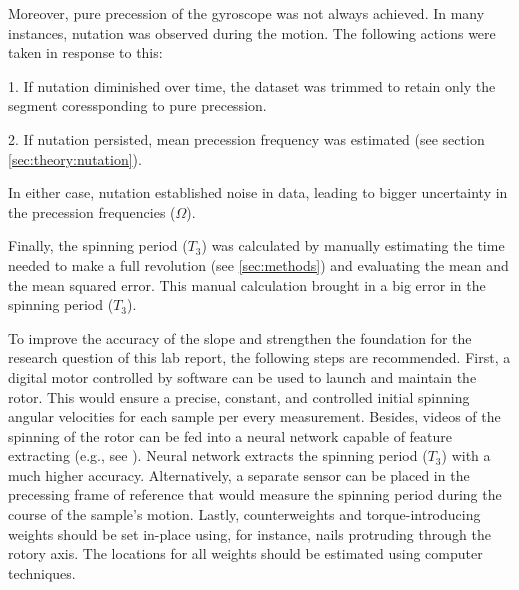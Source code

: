 \begin{multicols}{2}
Moreover, pure precession of the gyroscope was not always achieved. In many instances, nutation was observed during the motion. The following actions were taken in response to this:

1. If nutation diminished over time, the dataset was trimmed to retain only the segment coressponding to pure precession.

2. If nutation persisted, mean precession frequency was estimated (see section \ref{sec:theory:nutation}).

In either case, nutation established noise in data, leading to bigger uncertainty in the precession frequencies ($\Omega$).

Finally, the spinning period ($T_{3}$) was calculated by manually estimating the time needed to make a full revolution (see \ref{sec:methods}) and evaluating the mean and the mean squared error. This manual calculation brought in a big error in the spinning period ($T_{3}$).

To improve the accuracy of the slope and strengthen the foundation for the research question of this lab report, the following steps are recommended. First, a digital motor controlled by software can be used to launch and maintain the rotor. This would ensure a precise, constant, and controlled initial spinning angular velocities for each sample per every measurement. Besides, videos of the spinning of the rotor can be fed into a neural network capable of feature extracting (e.g., see \cite{nn}). Neural network extracts the spinning period ($T_{3}$) with a much higher accuracy. Alternatively, a separate sensor can be placed in the precessing frame of reference that would measure the spinning period during the course of the sample's motion. Lastly, counterweights and torque-introducing weights should be set in-place using, for instance, nails protruding through the rotory axis. The locations for all weights should be estimated using computer techniques.   
\end{multicols}
